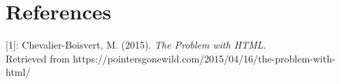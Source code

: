 \documentclass[12pt]{article}
\begin{document}
\section{References}
[1]: Chevalier-Boisvert, M. (2015). \textit{The Problem with HTML}. \\ Retrieved from https://pointersgonewild.com/2015/04/16/the-problem-with-html/
\end{document}
